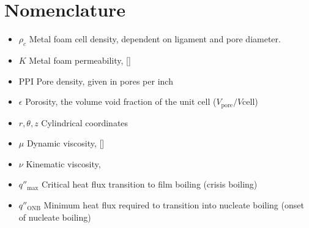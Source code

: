 \documentclass[compileTAMUreport.tex]{subfiles}
\begin{document}
\section{Nomenclature}

\begin{itemize}
\item $\rho_c$ Metal foam cell density, dependent on ligament and pore diameter.
\item $K$ Metal foam permeability, [\metre\squared]
\item $\mathrm{PPI}$ Pore density, given in pores per inch 
\item $\epsilon$ Porosity, the volume void fraction of the unit cell ($V_{\mathrm{pore}}/V{\mathrm{cell}}$)
\item $r,\theta, z$ Cylindrical coordinates
\item $\mu$ Dynamic viscosity, [\newton\second\per\meter\squared ]
\item $\nu$ Kinematic viscosity, \metre\per\second\squared
\item $q''_{\mathrm{max}}$ Critical heat flux transition to film boiling (crisis boiling)
\item $q''_{\mathrm{ONB}}$ Minimum heat flux required to transition into nucleate boiling (onset of nucleate boiling)
\end{itemize}
\end{document}
